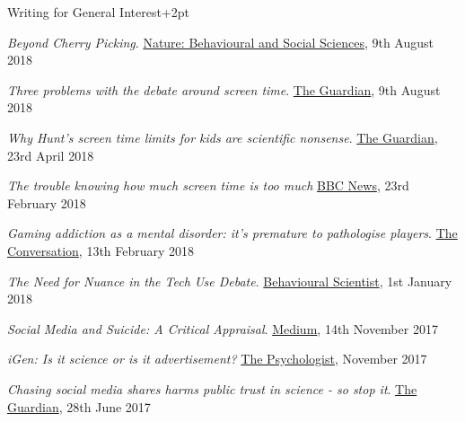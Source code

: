 \documentclass{resume} %
\begin{document}
\begin{rSection}{Writing for General Interest}\itemsep +2pt

\item \textit{Beyond Cherry Picking}. {\href{https://socialsciences.nature.com/users/200472-amy-orben/posts/42763-beyond-cherry-picking}{Nature: Behavioural and Social Sciences}}, 9th August 2018

\item \textit{Three problems with the debate around screen time}. {\href{https://www.theguardian.com/science/head-quarters/2018/aug/09/three-problems-with-the-debate-around-screen-time?CMP=share_btn_tw}{The Guardian}}, 9th August 2018

\item \textit{Why Hunt's screen time limits for kids are scientific nonsense}. {\href{https://www.theguardian.com/science/head-quarters/2018/apr/23/why-hunts-screen-time-limits-for-kids-are-scientific-nonsense}{The Guardian}}, 23rd April 2018

\item \textit{The trouble knowing how much screen time is too much} {\href{https://www.bbc.co.uk/news/technology-42907037}{BBC News}}, 23rd February 2018

\item \textit{Gaming addiction as a mental disorder: it’s premature to pathologise players}. {\href{https://theconversation.com/gaming-addiction-as-a-mental-disorder-its-premature-to-pathologise-players-89892}{The Conversation}}, 13th February 2018

\item \textit{The Need for Nuance in the Tech Use Debate}. {\href{http://behavioralscientist.org/need-nuance-conversation-amy-orben/}{Behavioural Scientist}}, 1st January 2018

\item \textit{Social Media and Suicide: A Critical Appraisal}. {\href{https://medium.com/@OrbenAmy/social-media-and-suicide-a-critical-appraisal-f95e0bbd4660}{Medium}}, 14th November 2017

\item \textit{iGen: Is it science or is it advertisement?} {\href{https://thepsychologist.bps.org.uk/volume-30/december-2017/igen-science-or-advertisement}{The Psychologist}}, November 2017

\item \textit{Chasing social media shares harms public trust in science - so stop it}. {\href{https://medium.com/@OrbenAmy/no-it-hasnt-been-proven-that-instagram-is-worst-for-young-mental-health-36894f33c237}{The Guardian}}, 28th June 2017


\end{rSection}
\end{document}
